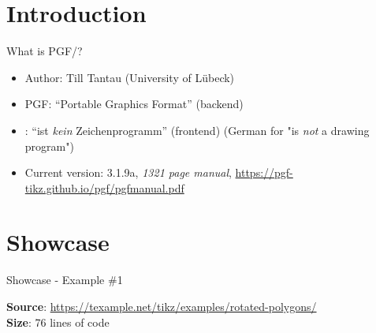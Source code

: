 \section{Introduction}

\begin{frame}{What is PGF/\TikZ?}
    \begin{itemize}
        \item Author: Till Tantau (University of L{\" u}beck)
        \item PGF: “Portable Graphics Format” (backend)
        \item \TikZ: “\TikZ ist \emph{kein} Zeichenprogramm” (frontend) (German for "\TikZ is \emph{not} a drawing program")
        \item Current version: 3.1.9a, \emph{1321 page manual}, {\scriptsize\url{https://pgf-tikz.github.io/pgf/pgfmanual.pdf}}
    \end{itemize}
\end{frame}

\section{Showcase}

\begin{frame}{Showcase - Example \#1}
    \begin{figure}
        \centering
        \begin{subfigure}[c]{0.3\textwidth}
            \centering
            \begin{adjustbox}{width=0.98\textwidth}
                
            \end{adjustbox}
        \end{subfigure}
        \begin{subfigure}[c]{0.3\textwidth}
            \centering
            \begin{adjustbox}{width=0.98\textwidth}
                
            \end{adjustbox}
        \end{subfigure}
        \begin{subfigure}[c]{0.3\textwidth}
            \centering
            \begin{adjustbox}{width=0.98\textwidth}
                
            \end{adjustbox}
        \end{subfigure}
    \end{figure}
    \textbf{Source}: {\scriptsize\url{https://texample.net/tikz/examples/rotated-polygons/}}
    \\
    \textbf{Size}: 76 lines of code
\end{frame}

